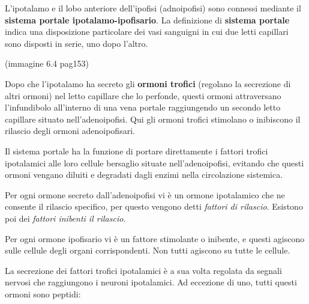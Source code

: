 \documentclass[]{article}
\begin{document}
L'ipotalamo e il lobo anteriore dell'ipofisi (adnoipofisi) sono connessi
mediante il \textbf{sistema portale ipotalamo-ipofisario}. La
definizione di \textbf{sistema portale} indica una disposizione
particolare dei vasi sanguigni in cui due letti capillari sono disposti
in serie, uno dopo l'altro.

(immagine 6.4 pag153)

Dopo che l'ipotalamo ha secreto gli \textbf{ormoni trofici} (regolano la
secrezione di altri ormoni) nel letto capillare che lo perfonde, questi
ormoni attraversano l'infundibolo all'interno di una vena portale
raggiungendo un secondo letto capillare situato nell'adenoipofisi. Qui
gli ormoni trofici stimolano o inibiscono il rilascio degli ormoni
adenoipofisari.

Il sistema portale ha la funzione di portare direttamente i fattori
trofici ipotalamici alle loro cellule bersaglio situate
nell'adenoipofisi, evitando che questi ormoni vengano diluiti e
degradati dagli enzimi nella circolazione sistemica.

Per ogni ormone secreto dall'adenoipofisi vi è un ormone ipotalamico che
ne consente il rilascio specifico, per questo vengono detti
\emph{fattori di rilascio}. Esistono poi dei \emph{fattori inibenti il
rilascio}.

Per ogni ormone ipofisario vi è un fattore stimolante o inibente, e
questi agiscono sulle cellule degli organi corrispondenti. Non tutti
agiscono su tutte le cellule.

La secrezione dei fattori trofici ipotalamici è a sua volta regolata da
segnali nervosi che raggiungono i neuroni ipotalamici. Ad eccezione di
uno, tutti questi ormoni sono peptidi:
\end{document}
